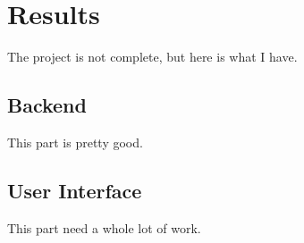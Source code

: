\chapter{Results}
 
 
The project is not complete, but here is what I have.


\section{Backend}

This part is pretty good.


\section{User Interface}

This part need a whole lot of work.
